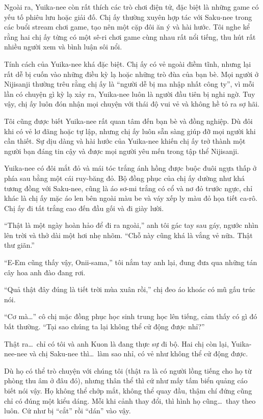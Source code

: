 \documentclass[../main.tex]{subfiles}
\begin{document}
Ngoài ra, Yuika-nee còn rất thích các trò chơi điện tử, đặc biệt là những game có yếu tố phiêu lưu hoặc giải đố. Chị ấy thường xuyên hợp tác với Saku-nee trong các buổi stream chơi game, tạo nên một cặp đôi ăn ý và hài hước. Tôi nghe kể rằng hai chị ấy từng có một sê-ri chơi game cùng nhau rất nổi tiếng, thu hút rất nhiều người xem và bình luận sôi nổi.

Tính cách của Yuika-nee khá đặc biệt. Chị ấy có vẻ ngoài điềm tĩnh, nhưng lại rất dễ bị cuốn vào những điều kỳ lạ hoặc những trò đùa của bạn bè. Mọi người ở Nijisanji thường trêu rằng chị ấy là ``người dễ bị ma nhập nhất công ty'', vì mỗi lần có chuyện gì kỳ lạ xảy ra, Yuika-nee luôn là người đầu tiên bị nghi ngờ. Tuy vậy, chị ấy luôn đón nhận mọi chuyện với thái độ vui vẻ và không hề tỏ ra sợ hãi.

Tôi cũng được biết Yuika-nee rất quan tâm đến bạn bè và đồng nghiệp. Dù đôi khi có vẻ lơ đãng hoặc tự lập, nhưng chị ấy luôn sẵn sàng giúp đỡ mọi người khi cần thiết. Sự dịu dàng và hài hước của Yuika-nee khiến chị ấy trở thành một người bạn đáng tin cậy và được mọi người yêu mến trong tập thể Nijisanji.

Yuika-nee có đôi mắt đỏ và mái tóc trắng ánh hồng được buộc đuôi ngựa thấp ở phía sau bằng một cái ruy-băng đỏ. Bộ đồng phục của chị ấy dường như khá tương đồng với Saku-nee, cũng là áo sơ-mi trắng có cổ và nơ đỏ trước ngực, chỉ khác là chị ấy mặc áo len bên ngoài màu be và váy xếp ly màu đỏ họa tiết ca-rô. Chị ấy đi tất trắng cao đến đầu gối và đi giày lười.

\chrint

``Thật là một ngày hoàn hảo để đi ra ngoài,'' anh tôi gác tay sau gáy, ngước nhìn lên trời và thở dài một hơi nhẹ nhõm. ``Chỗ này cũng khá là vắng vẻ nữa. Thật thư giãn.''

``E-Em cũng thấy vậy, Onii-sama,'' tôi nắm tay anh lại, đung đưa qua những tán cây hoa anh đào đang rơi.

``Quả thật đây đúng là tiết trời mùa xuân rồi,'' chị đeo áo khoác có mũ gấu trúc nói.

``Cơ mà\dots'' cô chị mặc đồng phục học sinh trung học lên tiếng, cảm thấy có gì đó bất thường. ``Tại sao chúng ta lại không thể cử động được nhỉ?''

Thật ra\dots\ chỉ có tôi và anh Kuon là đang thực sự đi bộ. Hai chị còn lại, Yuika-nee-nee và chị Saku-nee thì\dots\ làm sao nhỉ, có vẻ như không thể cử động được.

Dù họ có thể trò chuyện với chúng tôi (thật ra là có người lồng tiếng cho họ từ phòng thu âm ở đâu đó), nhưng thân thể thì cứ như mấy tấm biển quảng cáo biết nói vậy. Họ không thể chớp mắt, không thể quay đầu, thậm chí đứng cũng chỉ có đúng một kiểu dáng. Mỗi khi cảnh thay đổi, thì hình họ cũng\dots\ thay theo luôn. Cứ như bị ``cắt'' rồi ``dán'' vào vậy.
\end{document}
